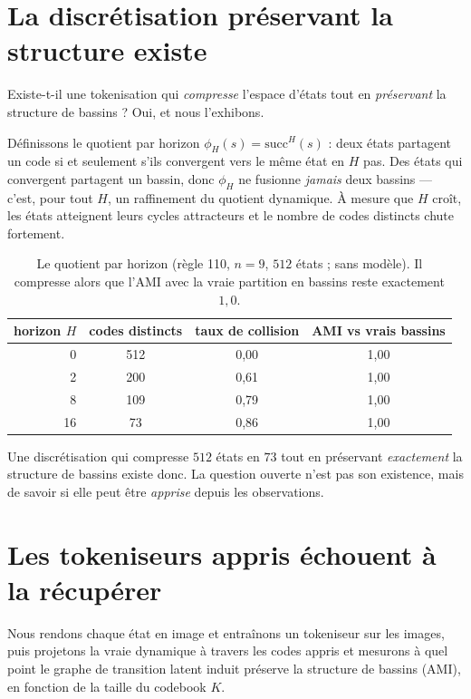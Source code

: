 \documentclass[11pt]{article}
\newcommand{\succf}{\mathrm{succ}}
\begin{document}
\section{La discrétisation préservant la structure existe}
\label{sec:exists}

Existe-t-il une tokenisation qui \emph{compresse} l'espace d'états tout en
\emph{préservant} la structure de bassins ? Oui, et nous l'exhibons.

Définissons le quotient par horizon $\phi_H(s) = \succf^{H}(s)$ : deux états
partagent un code si et seulement s'ils convergent vers le même état en $H$
pas. Des états qui convergent partagent un bassin, donc $\phi_H$ ne fusionne
\emph{jamais} deux bassins --- c'est, pour tout $H$, un raffinement du quotient
dynamique. À mesure que $H$ croît, les états atteignent leurs cycles
attracteurs et le nombre de codes distincts chute fortement.

\begin{table}[h]
\centering
\caption{Le quotient par horizon (règle 110, $n{=}9$, $512$ états ; sans
modèle). Il compresse alors que l'AMI avec la vraie partition en bassins reste
exactement $1{,}0$.}
\label{tab:horizon}
\begin{tabular}{rccc}
\toprule
horizon $H$ & codes distincts & taux de collision & AMI vs vrais bassins \\
\midrule
0  & 512 & 0,00 & 1,00 \\
2  & 200 & 0,61 & 1,00 \\
8  & 109 & 0,79 & 1,00 \\
16 &  73 & 0,86 & 1,00 \\
\bottomrule
\end{tabular}
\end{table}

Une discrétisation qui compresse $512$ états en $73$ tout en préservant
\emph{exactement} la structure de bassins existe donc. La question ouverte
n'est pas son existence, mais de savoir si elle peut être \emph{apprise} depuis
les observations.

\section{Les tokeniseurs appris échouent à la récupérer}
\label{sec:fail}

Nous rendons chaque état en image et entraînons un tokeniseur sur les images,
puis projetons la vraie dynamique à travers les codes appris et mesurons à quel
point le graphe de transition latent induit préserve la structure de bassins
(AMI), en fonction de la taille du codebook $K$.
\end{document}
